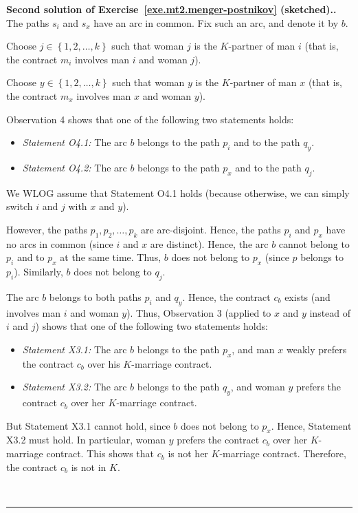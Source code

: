 \documentclass[numbers=enddot,12pt,final,onecolumn,notitlepage]{scrartcl}%
\theoremstyle{definition}
\newenvironment{proof}[1][Proof]{\noindent\textbf{#1.} }{\ \rule{0.5em}{0.5em}}
\newcommand{\set}[1]{\left\{ #1 \right\}}
\begin{document}
\begin{proof}[Second solution of
Exercise~\ref{exe.mt2.menger-postnikov} (sketched).]
The paths $s_i$ and $s_x$ have an arc in common.
Fix such an arc, and denote it by $b$.

Choose $j \in \set{1, 2, \ldots, k}$ such that
woman $j$ is the $K$-partner of man $i$
(that is, the contract $m_i$ involves man $i$ and woman $j$).

Choose $y \in \set{1, 2, \ldots, k}$ such that
woman $y$ is the $K$-partner of man $x$
(that is, the contract $m_x$ involves man $x$ and woman $y$).

Observation 4 shows that one of the following two statements holds:

\begin{itemize}
\item \textit{Statement O4.1:}
   The arc $b$ belongs to the path $p_i$ and to the
   path $q_y$.

\item \textit{Statement O4.2:}
   The arc $b$ belongs to the path $p_x$ and to the
   path $q_j$.
\end{itemize}

We WLOG assume that Statement O4.1 holds (because otherwise,
we can simply switch $i$ and $j$ with $x$ and $y$).

However, the paths $p_1, p_2, \ldots, p_k$ are arc-disjoint.
Hence, the paths $p_i$ and $p_x$ have no arcs in common (since
$i$ and $x$ are distinct).
Hence, the arc $b$ cannot belong to $p_i$ and to $p_x$ at the
same time.
Thus, $b$ does not belong to $p_x$ (since $p$ belongs to $p_i$).
Similarly, $b$ does not belong to $q_j$.

The arc $b$ belongs to both paths $p_i$ and $q_y$.
Hence, the contract $c_b$ exists (and involves man $i$ and
woman $y$).
Thus,
Observation 3 (applied to $x$ and $y$ instead of $i$ and $j$)
shows that one of the following two statements holds:

\begin{itemize}
\item \textit{Statement X3.1:}
   The arc $b$ belongs to the path $p_x$, and
   man $x$ weakly prefers
   the contract $c_b$ over his $K$-marriage contract.

\item \textit{Statement X3.2:}
   The arc $b$ belongs to the path $q_y$, and
   woman $y$ prefers
   the contract $c_b$ over her $K$-marriage contract.
\end{itemize}

But Statement X3.1 cannot hold, since $b$ does not belong to $p_x$.
Hence, Statement X3.2 must hold.
In particular, woman $y$ prefers the contract $c_b$ over her
$K$-marriage contract.
This shows that $c_b$ is not her $K$-marriage contract.
Therefore, the contract $c_b$ is not in $K$.


\end{proof}
\end{document}
